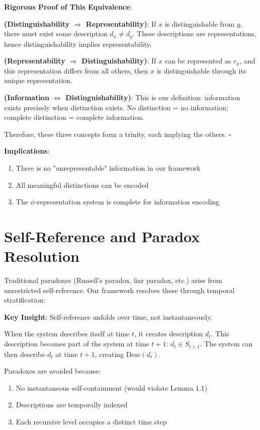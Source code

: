 \textbf{Rigorous Proof of This Equivalence}:

\textbf{(Distinguishability $\Rightarrow$ Representability)}:
If $x$ is distinguishable from $y$, there must exist some description $d_x \neq d_y$.
These descriptions are representations, hence distinguishability implies representability.

\textbf{(Representability $\Rightarrow$ Distinguishability)}:
If $x$ can be represented as $r_x$, and this representation differs from all others,
then $x$ is distinguishable through its unique representation.

\textbf{(Information $\Leftrightarrow$ Distinguishability)}:
This is our definition: information exists precisely when distinction exists.
No distinction = no information; complete distinction = complete information.

Therefore, these three concepts form a trinity, each implying the others. $\square$

\textbf{Implications}:
\begin{enumerate}
\item There is no "unrepresentable" information in our framework
\item All meaningful distinctions can be encoded
\item The $\phi$-representation system is complete for information encoding
\end{enumerate}

\section{Self-Reference and Paradox Resolution}
\label{sec:ch01_axiom_and_derivation:self-reference-and-paradox-resolution}

Traditional paradoxes (Russell's paradox, liar paradox, etc.) arise from unrestricted self-reference. Our framework resolves these through temporal stratification:

\textbf{Key Insight}: Self-reference unfolds over time, not instantaneously.

When the system describes itself at time $t$, it creates description $d_t$.
This description becomes part of the system at time $t+1$: $d_t \in S_{t+1}$.
The system can then describe $d_t$ at time $t+1$, creating $\text{Desc}(d_t)$.

Paradoxes are avoided because:
\begin{enumerate}
\item No instantaneous self-containment (would violate Lemma 1.1)
\item Descriptions are temporally indexed
\item Each recursive level occupies a distinct time step
\end{enumerate}

